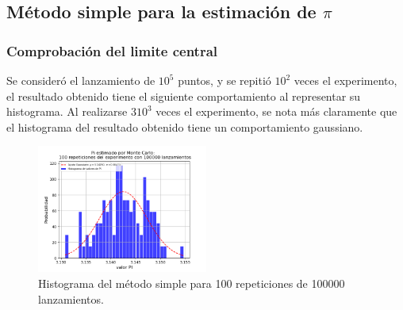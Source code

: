 \documentclass{rbf}
\begin{document}
\subsection{Método simple para la estimación de $\pi$}
\subsubsection{Comprobación del limite central}
Se consideró el lanzamiento de $10^5$ puntos, y se repitió $10^2$ veces el experimento, el resultado obtenido tiene el siguiente comportamiento al representar su histograma. Al realizarse $3 10^3$ veces el experimento, se nota más claramente que el histograma del resultado obtenido tiene un comportamiento gaussiano. 
\begin{figure}[h]
 \centering
  \includegraphics[width=0.5\textwidth]{figures/MCn1e5m100.png}
	\caption{Histograma del método simple para 100 repeticiones de 100000 lanzamientos.}
 \label{buff1}
\end{figure}
\end{document}
